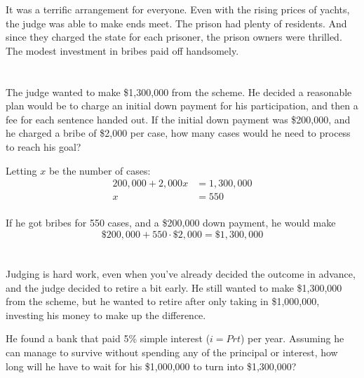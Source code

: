 \documentclass[letterpaper]{exam}
\begin{document}
\begin{questions}
      It was a terrific arrangement for everyone.  Even with the rising prices of yachts, the judge
      was able to make ends meet.  The prison had plenty of residents.  And since they charged the
      state for each prisoner, the prison owners were thrilled. The modest investment in bribes paid
      off handsomely.

      \begin{parts}
        \part{}
          The judge wanted to make \$1,300,000 from the scheme.  He decided a reasonable plan would
          be to charge an initial down payment for his participation, and then a fee for each
          sentence handed out.  If the initial down payment was \$200,000, and he charged a bribe of
          \$2,000 per case, how many cases would he need to process to reach his goal?

          \begin{solution}
            Letting $x$ be the number of cases:
            \begin{align*}
              200,000 + 2,000x & = 1,300,000 \\
              x                & = \boxed{ 550 } \\
            \end{align*}

            If he got bribes for 550 cases, and a \$200,000 down payment, he would make 
            \[
              \$200,000 + 550 \cdot \$2,000 = \$1,300,000
            \]
          \end{solution}

        \part{}
          Judging is hard work, even when you've already decided the outcome in advance, and the
          judge decided to retire a bit early.  He still wanted to make \$1,300,000 from the scheme,
          but he wanted to retire after only taking in \$1,000,000, investing his money to make up
          the difference.  

          He found a bank that paid 5\% simple interest ($i = Prt$) per year. Assuming he can manage
          to survive without spending any of the principal or interest, how long will he have to
          wait for his \$1,000,000 to turn into \$1,300,000?


\end{parts}
\end{questions}
\end{document}
